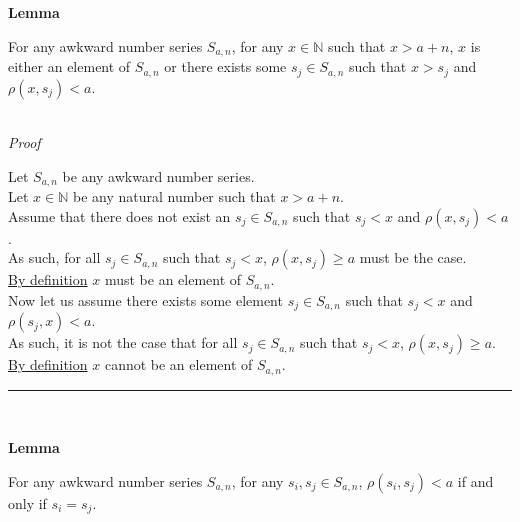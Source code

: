 \documentclass[a4paper,12pt]{article}
\begin{document}
\label{lemma:exists_element_less_than_x}
\hypertarget{lemma:exists_element_less_than_x}{}
\begin{tcolorbox}
\textbf{Lemma}

For any awkward number series $S_{a, n}$, for any $x \in \mathbb{N}$ such that $x > a + n$, $x$ is either an element of $S_{a, n}$ or there exists some $s_j \in S_{a, n}$ such that $x > s_j$ and $\rho(x, s_j) < a$. 
\end{tcolorbox}

\noindent \\
\textit{Proof}

\noindent Let $S_{a, n}$ be any awkward number series.\\

\noindent Let $x \in \mathbb{N}$ be any natural number such that $x > a + n$.\\

\noindent Assume that there does not exist an $s_j \in S_{a, n}$ such that $s_j < x$ and $\rho(x, s_j) < a$.\\

\noindent As such, for all $s_j \in S_{a, n}$ such that $s_j < x$, $\rho(x, s_j) \geq a$ must be the case.\\

\noindent \hyperlink{definition:awkward_number_series}{By definition} $x$ must be an element of $S_{a, n}$.\\

\noindent Now let us assume there exists some element $s_j \in S_{a, n}$ such that $s_j < x$ and $\rho(s_j, x) < a$.\\

\noindent As such, it is not the case that for all $s_j \in S_{a, n}$ such that $s_j < x$, $\rho(x, s_j) \geq a$.\\

\noindent \hyperlink{definition:awkward_number_series}{By definition} $x$ cannot be an element of $S_{a, n}$.


\begin{center}
\noindent\rule{8cm}{0.4pt}
\end{center}
\noindent \\









\label{lemma:non_divisibility_of_elements}
\hypertarget{lemma:non_divisibility_of_elements}{}
\begin{tcolorbox}
\textbf{Lemma}

For any awkward number series $S_{a, n}$, for any $s_i, s_j \in S_{a, n}$, $\rho(s_i, s_j) < a$ if and only if $s_i = s_j$.
\end{tcolorbox}
\end{document}
